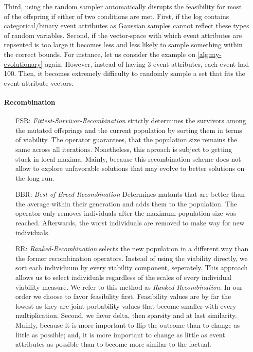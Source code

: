 \documentclass[./../../paper.tex]{subfiles}
\begin{document}
Third, using the random sampler automatically disrupts the feasibility for most of the offspring if either of two conditions are met. First, if the log contains categorical/binary event attributes as Gaussian samples cannot reflect these types of random variables. Second, if the vector-space with which event attributes are repsented is too large it becomes less and less likely to sample something within the correct bounds.
For instance, let us consider the example on \autoref{alg:my-evolutionary} again.
However, instead of having 3 event attributes, each event had 100. Then, it becomes extremely difficulty to randomly sample a set that fits the event attribute vectors.

\paragraph{Recombination}
\begin{enumerate}
    \item[FSR:] \emph{Fittest-Survivor-Recombination} strictly determines the survivors among the mutated offsprings and the current population by sorting them in terms of viability.
    The operator guarantees, that the population size remains the same across all iterations.
    Nonetheless, this aproach is subject to getting stuck in local maxima. Mainly, because this recombination scheme does not allow to explore unfavorable solutions that may evolve to better solutions on the long run.
    \item[BBR:] \emph{Best-of-Breed-Recombination} Determines mutants that are better than the average within their generation and adds them to the population. The operator only removes individuals after the maximum population size was reached. Afterwards, the worst individuals are removed to make way for new individuals.
    \item[RR:] \emph{Ranked-Recombination} selects the new population in a different way than the former recombination operators. Instead of using the viability directly, we sort each individuum by every viability component, seperately. This approach allows us to select individuals regardless of the scales of every individual viability measure. We refer to this method as \emph{Ranked-Recombination}. In our order we choose to favor feasibility first. Feasibility values are by far the lowest as they are joint porbability values that become smaller with every multiplication. Second, we favor delta, then sparsity and at last similarity. Mainly, because it is more important to flip the outcome than to change as little as possible; and, it is more important to change as little as event attributes as possible than to become more similar to the factual.
\end{enumerate}
\end{document}
